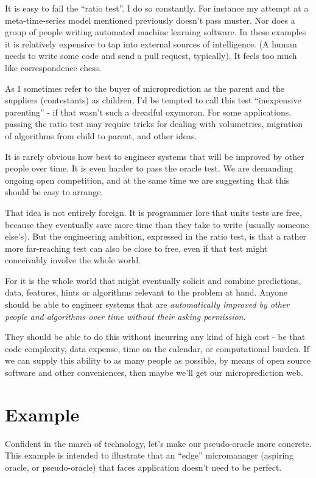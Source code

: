 It is easy to fail the ``ratio test''. I do so constantly. For instance my attempt at a meta-time-series model mentioned previously doesn't pass muster. Nor does a group of people writing automated machine learning software. In these examples it is relatively expensive to tap into external sources of intelligence. (A human needs to write some code and send a pull request, typically). It feels too much like correspondence chess.  

As I sometimes refer to the buyer of microprediction as the parent and the suppliers (contestants) as children, I'd be tempted to call this test ``inexpensive parenting'' - if that wasn't such a dreadful oxymoron. For some applications, passing the ratio test may require tricks for dealing with volumetrics, migration of algorithms from child to parent, and other ideas. 

It is rarely obvious how best to engineer systems that will be improved by other people over time. It is even harder to pass the oracle test. We are demanding ongoing open competition, and at the same time we are suggesting that this should be easy to arrange. 

That idea is not entirely foreign. It is programmer lore that units tests are free, because they eventually save more time than they take to write (usually someone else's). But the engineering ambition, expressed in the ratio test, is that a rather more far-reaching test can also be close to free, even if that test might conceivably involve the whole world. 

For it is the whole world that might eventually solicit and combine predictions, data, features, hints or algorithms relevant to the problem at hand. Anyone should be able to engineer systems that are {\em automatically improved by other people and algorithms over time without their asking permission}. 

They should be able to do this without incurring any kind of high cost - be that code complexity, data expense, time on the calendar, or computational burden. If we can supply this ability to as many people as possible, by means of open source software and other conveniences, then maybe we'll get our microprediction web. 

\section{Example}

Confident in the march of technology, let's make our pseudo-oracle more concrete. This example is intended to illustrate that an ``edge'' micromanager (aspiring oracle, or pseudo-oracle) that faces application doesn't need to be perfect. 

